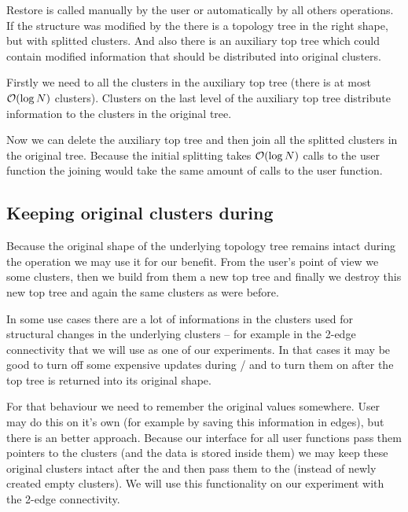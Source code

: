 Restore is called manually by the user or automatically by all others
operations. If the structure was modified by the \Expose{} there is a topology
tree in the right shape, but with splitted clusters. And also there is an
auxiliary top tree which could contain modified information that should be
distributed into original clusters.

Firstly we need to \Split{} all the clusters in the auxiliary top tree (there
is at most ${\cal O}(\log N)$ clusters). Clusters on the last level of the auxiliary
top tree distribute information to the clusters in the original tree.

Now we can delete the auxiliary top tree and then join all the splitted clusters
in the original tree. Because the initial splitting takes ${\cal O}(\log N)$ calls to
the \Split{} user function the joining would take the same amount of calls to
the \Join{} user function.

\subsection{Keeping original clusters during \Expose}

Because the original shape of the underlying topology tree remains intact during
the \Expose{} operation we may use it for our benefit. From the user's point of
view we \Split{} some clusters, then we build from them a new top tree and
finally we destroy this new top tree and \Join{} again the same clusters as were
before.

In some use cases there are a lot of informations in the clusters used for
structural changes in the underlying clusters -- for example in the 2-edge
connectivity that we will use as one of our experiments. In that cases it may be
good to turn off some expensive updates during \Join/\Split{} and to turn them
on after the top tree is returned into its original shape.

For that behaviour we need to remember the original values somewhere. User may do this
on it's own (for example by saving this information in edges), but there is an
better approach. Because our interface for all user functions pass them pointers
to the clusters (and the data is stored inside them) we may keep these original
clusters intact after the \Split{} and then pass them to the \Join{} (instead of
newly created empty clusters). We will use this functionality on our experiment
with the 2-edge connectivity.
